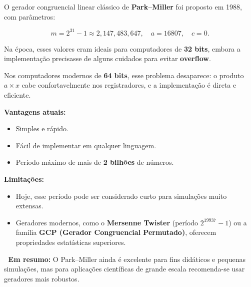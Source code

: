 \documentclass[
  letterpaper,
  DIV=11,
  numbers=noendperiod]{scrreprt}
\begin{document}
\begin{tcolorbox}[enhanced jigsaw, left=2mm, toprule=.15mm, opacityback=0, title=\textcolor{quarto-callout-note-color}{\faInfo}\hspace{0.5em}{Park--Miller hoje: ainda vale a pena?}, leftrule=.75mm, breakable, colbacktitle=quarto-callout-note-color!10!white, coltitle=black, rightrule=.15mm, bottomtitle=1mm, toptitle=1mm, colframe=quarto-callout-note-color-frame, colback=white, opacitybacktitle=0.6, bottomrule=.15mm, arc=.35mm, titlerule=0mm]

O gerador congruencial linear clássico de \textbf{Park--Miller} foi
proposto em 1988, com parâmetros:

\[m = 2^{31} - 1 \approx 2,147,483,647, \quad a = 16807, \quad c = 0.\]

Na época, esses valores eram ideais para computadores de \textbf{32
bits}, embora a implementação precisasse de alguns cuidados para evitar
\textbf{overflow}.

Nos computadores modernos de \textbf{64 bits}, esse problema desaparece:
o produto \(a \times x\) cabe confortavelmente nos registradores, e a
implementação é direta e eficiente.

\textbf{Vantagens atuais:}

\begin{itemize}
\item
  Simples e rápido.
\item
  Fácil de implementar em qualquer linguagem.
\item
  Período máximo de mais de \textbf{2 bilhões} de números.
\end{itemize}

\textbf{Limitações:}

\begin{itemize}
\item
  Hoje, esse período pode ser considerado curto para simulações muito
  extensas.
\item
  Geradores modernos, como o \textbf{Mersenne Twister} (período
  \(2^{19937}-1\)) ou a família \textbf{GCP (Gerador Congruencial
  Permutado)}, oferecem propriedades estatísticas superiores.
\end{itemize}

📌 \textbf{Em resumo:} O Park--Miller ainda é excelente para fins
didáticos e pequenas simulações, mas para aplicações científicas de
grande escala recomenda-se usar geradores mais robustos.

\end{tcolorbox}
\end{document}
